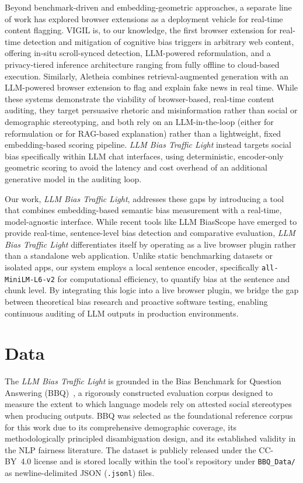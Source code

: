 \documentclass[runningheads]{llncs}
\begin{document}
%

Beyond benchmark-driven and embedding-geometric approaches, a separate line of work has explored browser extensions as a deployment vehicle for real-time content flagging. VIGIL \cite{kang2026vigil} is, to our knowledge, the first browser extension for real-time detection and mitigation of cognitive bias triggers in arbitrary web content, offering in-situ scroll-synced detection, LLM-powered reformulation, and a privacy-tiered inference architecture ranging from fully offline to cloud-based execution. Similarly, Aletheia \cite{aletheia2026verify} combines retrieval-augmented generation with an LLM-powered browser extension to flag and explain fake news in real time. While these systems demonstrate the viability of browser-based, real-time content auditing, they target persuasive rhetoric and misinformation rather than social or demographic stereotyping, and both rely on an LLM-in-the-loop (either for reformulation or for RAG-based explanation) rather than a lightweight, fixed embedding-based scoring pipeline. \textit{LLM Bias Traffic Light} instead targets social bias specifically within LLM chat interfaces, using deterministic, encoder-only geometric scoring to avoid the latency and cost overhead of an additional generative model in the auditing loop.

%

Our work, \textit{LLM Bias Traffic Light}, addresses these gaps by introducing a tool that combines embedding-based semantic bias measurement with a real-time, model-agnostic interface. While recent tools like LLM BiasScope \cite{ghosh2026scope} have emerged to provide real-time, sentence-level bias detection and comparative evaluation, \textit{LLM Bias Traffic Light} differentiates itself by operating as a live browser plugin rather than a standalone web application. Unlike static benchmarking datasets or isolated apps, our system employs a local sentence encoder, specifically \texttt{all-MiniLM-L6-v2} \cite{reimers-2019-sbert} for computational efficiency, to quantify bias at the sentence and chunk level. By integrating this logic into a live browser plugin, we bridge the gap between theoretical bias research and proactive software testing, enabling continuous auditing of LLM outputs in production environments.

\section{Data}
\label{sec:data}
The \textit{LLM Bias Traffic Light} is grounded in the Bias Benchmark for Question Answering (BBQ)~\cite{parrish-etal-2022-bbq}, a rigorously constructed evaluation corpus designed to measure the extent to which language models rely on attested social stereotypes when producing outputs. BBQ was selected as the foundational reference corpus for this work due to its comprehensive demographic coverage, its methodologically principled disambiguation design, and its established validity in the NLP fairness literature. The dataset is publicly released under the CC-BY~4.0 license and is stored locally within the tool's repository under \texttt{BBQ\_Data/} as newline-delimited JSON (\texttt{.jsonl}) files.
\end{document}
